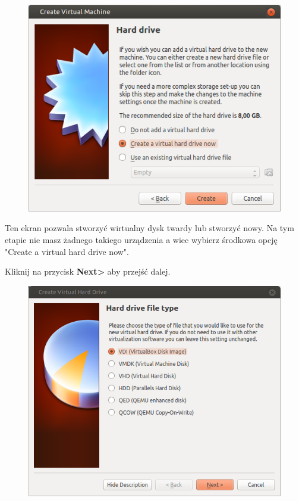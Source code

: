 \begin{figure}
                \includegraphics[width=\linewidth]{images/virtualbox_wizard3.png}
\end{figure}
Ten ekran pozwala stworzyć wirtualny dysk twardy lub stworzyć nowy. Na tym etapie nie masz żadnego takiego urządzenia a wiec wybierz środkowa opcję "Create a virtual hard drive now".
\begin{flushright}
Kliknij na przycisk \textbf{Next\textgreater} aby przejść dalej.
\end{flushright}
\clearpage
\begin{figure}
                \includegraphics[width=\linewidth]{images/virtualbox_wizard4.png}
\end{figure}
